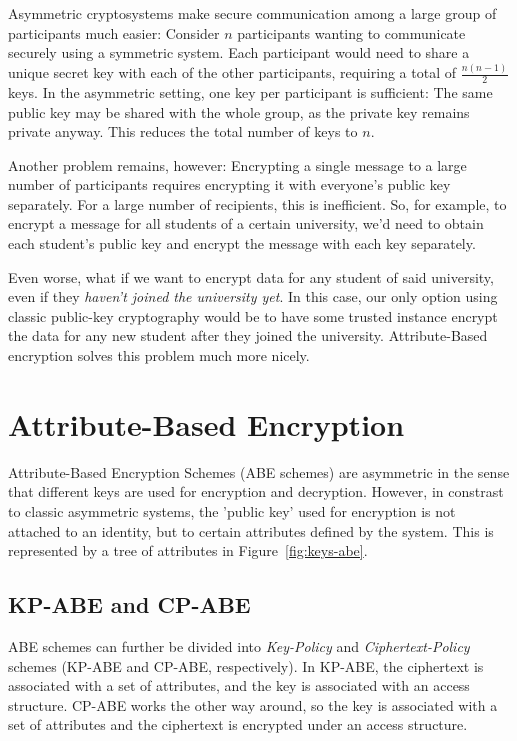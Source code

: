 Asymmetric cryptosystems make secure communication among a large group of participants much easier:
Consider $n$ participants wanting to communicate securely using a symmetric system.
Each participant would need to share a unique secret key with each of the other participants, requiring a total of $\frac{n(n-1)}{2}$ keys. In the asymmetric setting, one key per participant is sufficient:
The same public key may be shared with the whole group, as the private key remains private anyway. This reduces the total number of keys to $n$.

Another problem remains, however: Encrypting a single message to a large number of participants requires encrypting it with everyone's public key separately.
For a large number of recipients, this is inefficient.
So, for example, to encrypt a message for all students of a certain university, we'd need to obtain each student's public key and encrypt the message with each key separately.

Even worse, what if we want to encrypt data for any student of said university, even if they \emph{haven't joined the university yet}.
In this case, our only option using classic public-key cryptography would be to have some trusted instance encrypt the data for any new student after they joined the university.
Attribute-Based encryption solves this problem much more nicely. 

\section{Attribute-Based Encryption}

Attribute-Based Encryption Schemes (ABE schemes) are asymmetric in the sense that different keys are used for encryption and decryption.
However, in constrast to classic asymmetric systems, the 'public key' used for encryption is not attached to an identity, but to certain attributes defined by the system.
This is represented by a tree of attributes in Figure~\ref{fig:keys-abe}.


\subsection{KP-ABE and CP-ABE}
ABE schemes can further be divided into \emph{Key-Policy} and \emph{Ciphertext-Policy} schemes (KP-ABE and CP-ABE, respectively).
In KP-ABE, the ciphertext is associated with a set of attributes, and the key is associated with an access structure.
CP-ABE works the other way around, so the key is associated with a set of attributes and the ciphertext is encrypted under an access structure.

